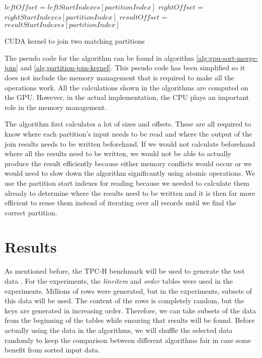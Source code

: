 \documentclass[a4paper,titlepage]{article}
\begin{document}
\begin{algorithm}
 \label{alg:partition-join-kernel}
 $leftOffset$ = $leftStartIndexes[partitionIndex]$ \;
 $rightOffset$ = $rightStartIndexes[partitionIndex]$ \;
 $resultOffset$ = $resultStartIndexes[partitionIndex]$ \;
 \;
 \caption{CUDA kernel to join two matching partitions}
\end{algorithm}

The pseudo code for the algorithm can be found in algorithm \ref{alg:gpu-sort-merge-join} and \ref{alg:partition-join-kernel}. This pseudo code has been simplified so it does not include the memory management that is required to make all the operations work. All the calculations shown in the algorithms are computed on the GPU. However, in the actual implementation, the CPU plays an important role in the memory management. 

The algorithm first calculates a lot of sizes and offsets. These are all required to know where each partition's input needs to be read and where the output of the join results needs to be written beforehand. If we would not calculate beforehand where all the results need to be written, we would not be able to actually produce the result efficiently because either memory conflicts would occur or we would need to slow down the algorithm significantly using atomic operations. We use the partition start indexes for reading because we needed to calculate them already to determine where the results need to be written and it is then far more efficient to reuse them instead of iterating over all records until we find the correct partition.

\section{Results}
\label{sec:results}
As mentioned before, the TPC-H benchmark will be used to generate the test data \cite{tpc-h}. For the experiments, the \emph{lineitem} and \emph{order} tables were used in the experiments. Millions of rows were generated, but in the experiments, subsets of this data will be used. The content of the rows is completely random, but the keys are generated in increasing order. Therefore, we can take subsets of the data from the beginning of the tables while ensuring that results will be found. Before actually using the data in the algorithms, we will shuffle the selected data randomly to keep the comparison between different algorithms fair in case some benefit from sorted input data.
\end{document}
